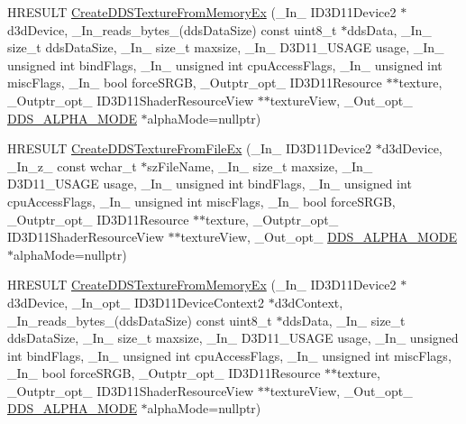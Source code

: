 \begin{DoxyCompactItemize}
\item 
H\+R\+E\+S\+U\+LT \hyperlink{namespace_direct_x_a748175ff5e71e07115f20524fe646ca1}{Create\+D\+D\+S\+Texture\+From\+Memory\+Ex} (\+\_\+\+In\+\_\+ I\+D3\+D11\+Device2 $\ast$d3d\+Device, \+\_\+\+In\+\_\+reads\+\_\+bytes\+\_\+(dds\+Data\+Size) const uint8\+\_\+t $\ast$dds\+Data, \+\_\+\+In\+\_\+ size\+\_\+t dds\+Data\+Size, \+\_\+\+In\+\_\+ size\+\_\+t maxsize, \+\_\+\+In\+\_\+ D3\+D11\+\_\+\+U\+S\+A\+GE usage, \+\_\+\+In\+\_\+ unsigned int bind\+Flags, \+\_\+\+In\+\_\+ unsigned int cpu\+Access\+Flags, \+\_\+\+In\+\_\+ unsigned int misc\+Flags, \+\_\+\+In\+\_\+ bool force\+S\+R\+GB, \+\_\+\+Outptr\+\_\+opt\+\_\+ I\+D3\+D11\+Resource $\ast$$\ast$texture, \+\_\+\+Outptr\+\_\+opt\+\_\+ I\+D3\+D11\+Shader\+Resource\+View $\ast$$\ast$texture\+View, \+\_\+\+Out\+\_\+opt\+\_\+ \hyperlink{namespace_direct_x_a7cb48689d75471680c0bf7f79caaaf1f}{D\+D\+S\+\_\+\+A\+L\+P\+H\+A\+\_\+\+M\+O\+DE} $\ast$alpha\+Mode=nullptr)
\item 
H\+R\+E\+S\+U\+LT \hyperlink{namespace_direct_x_af549eeef980a25e9ccf23cd6e42ab994}{Create\+D\+D\+S\+Texture\+From\+File\+Ex} (\+\_\+\+In\+\_\+ I\+D3\+D11\+Device2 $\ast$d3d\+Device, \+\_\+\+In\+\_\+z\+\_\+ const wchar\+\_\+t $\ast$sz\+File\+Name, \+\_\+\+In\+\_\+ size\+\_\+t maxsize, \+\_\+\+In\+\_\+ D3\+D11\+\_\+\+U\+S\+A\+GE usage, \+\_\+\+In\+\_\+ unsigned int bind\+Flags, \+\_\+\+In\+\_\+ unsigned int cpu\+Access\+Flags, \+\_\+\+In\+\_\+ unsigned int misc\+Flags, \+\_\+\+In\+\_\+ bool force\+S\+R\+GB, \+\_\+\+Outptr\+\_\+opt\+\_\+ I\+D3\+D11\+Resource $\ast$$\ast$texture, \+\_\+\+Outptr\+\_\+opt\+\_\+ I\+D3\+D11\+Shader\+Resource\+View $\ast$$\ast$texture\+View, \+\_\+\+Out\+\_\+opt\+\_\+ \hyperlink{namespace_direct_x_a7cb48689d75471680c0bf7f79caaaf1f}{D\+D\+S\+\_\+\+A\+L\+P\+H\+A\+\_\+\+M\+O\+DE} $\ast$alpha\+Mode=nullptr)
\item 
H\+R\+E\+S\+U\+LT \hyperlink{namespace_direct_x_ae4dd550eb23d07f5121a3030b3dcca10}{Create\+D\+D\+S\+Texture\+From\+Memory\+Ex} (\+\_\+\+In\+\_\+ I\+D3\+D11\+Device2 $\ast$d3d\+Device, \+\_\+\+In\+\_\+opt\+\_\+ I\+D3\+D11\+Device\+Context2 $\ast$d3d\+Context, \+\_\+\+In\+\_\+reads\+\_\+bytes\+\_\+(dds\+Data\+Size) const uint8\+\_\+t $\ast$dds\+Data, \+\_\+\+In\+\_\+ size\+\_\+t dds\+Data\+Size, \+\_\+\+In\+\_\+ size\+\_\+t maxsize, \+\_\+\+In\+\_\+ D3\+D11\+\_\+\+U\+S\+A\+GE usage, \+\_\+\+In\+\_\+ unsigned int bind\+Flags, \+\_\+\+In\+\_\+ unsigned int cpu\+Access\+Flags, \+\_\+\+In\+\_\+ unsigned int misc\+Flags, \+\_\+\+In\+\_\+ bool force\+S\+R\+GB, \+\_\+\+Outptr\+\_\+opt\+\_\+ I\+D3\+D11\+Resource $\ast$$\ast$texture, \+\_\+\+Outptr\+\_\+opt\+\_\+ I\+D3\+D11\+Shader\+Resource\+View $\ast$$\ast$texture\+View, \+\_\+\+Out\+\_\+opt\+\_\+ \hyperlink{namespace_direct_x_a7cb48689d75471680c0bf7f79caaaf1f}{D\+D\+S\+\_\+\+A\+L\+P\+H\+A\+\_\+\+M\+O\+DE} $\ast$alpha\+Mode=nullptr)

\end{DoxyCompactItemize}
